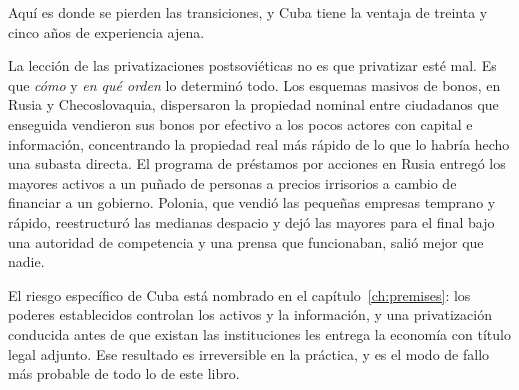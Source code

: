 Aquí es donde se pierden las transiciones, y Cuba tiene la ventaja de treinta y cinco años de
experiencia ajena.

La lección de las privatizaciones postsoviéticas no es que privatizar esté mal. Es que
\emph{cómo} y \emph{en qué orden} lo determinó todo. Los esquemas masivos de bonos, en Rusia y
Checoslovaquia, dispersaron la propiedad nominal entre ciudadanos que enseguida vendieron sus
bonos por efectivo a los pocos actores con capital e información, concentrando la propiedad real
más rápido de lo que lo habría hecho una subasta directa. El programa de préstamos por acciones
en Rusia entregó los mayores activos a un puñado de personas a precios irrisorios a cambio de
financiar a un gobierno. Polonia, que vendió las pequeñas empresas temprano y rápido,
reestructuró las medianas despacio y dejó las mayores para el final bajo una autoridad de
competencia y una prensa que funcionaban, salió mejor que nadie.

El riesgo específico de Cuba está nombrado en el capítulo~\ref{ch:premises}: los
poderes establecidos controlan los activos y la información, y una privatización conducida
antes de que existan las instituciones les entrega la economía con título legal adjunto. Ese resultado es
irreversible en la práctica, y es el modo de fallo más probable de todo lo de este libro.

